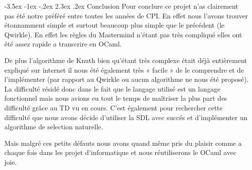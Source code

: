 \documentclass[11pt, a4paper]{article}
\makeatletter
\renewcommand{\section}{\@startsection{section}{1}{\z@}%
          {-3.5ex \@plus -1ex \@minus -.2ex}%
          {2.3ex \@plus .2ex}%
          {\reset@font\Large\bfseries	}}
\makeatother
\begin{document}
\section{Conclusion} 
Pour conclure ce projet n’as clairement pas été notre préféré entre toutes les années de CPI. En effet nous l’avons trouver étonnamment 
simple et surtout beaucoup plus simple que le précédent (le Qwirkle). En effet les règles du Mastermind n’étant pas très compliqué elles ont été assez rapide a transcrire en OCaml.

\vspace{3  mm}

De plus l’algorithme de Knuth bien qu’étant très complexe était déjà entièrement expliqué sur internet il nous été également très « facile » de le comprendre
et de l’implémenter (par rapport au Qwirkle ou aucun algorithme ne nous été proposé). La difficulté résidé donc dans le fait que le langage utilisé est un 
langage fonctionnel mais nous avions eu tout le temps de maîtriser la plus part des difficulté grâce au TD vu en cours. C’est également pour rechercher cette
difficulté que nous avons décide d’utiliser la SDL avec succés et d'implémenter un algorithme de selection naturelle.

\vspace{3  mm}

Mais malgré ces petits défauts nous avons quand même pris du plaisir comme a chaque fois dans les projet d’informatique et nous réutiliserons le OCaml avec joie.
\end{document}
